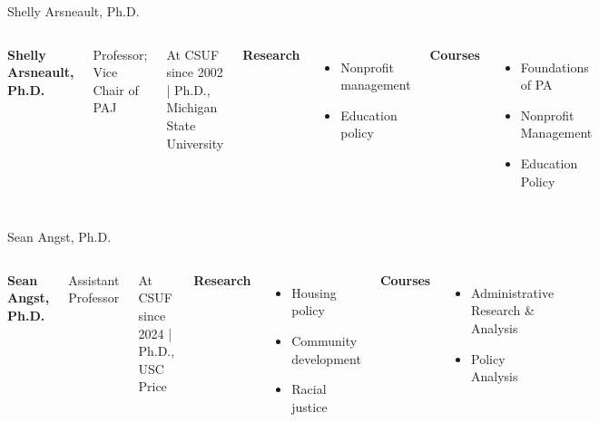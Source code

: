 \documentclass[10pt]{beamer}
\begin{document}
\begin{frame}{Shelly Arsneault, Ph.D.}
\begin{columns}[T,onlytextwidth]
    \raggedright
    {\large\bfseries Shelly Arsneault, Ph.D.}\par
    {Professor; Vice Chair of PAJ}\par
    {\footnotesize At CSUF since 2002 \quad | \quad Ph.D., Michigan State University}\par\vspace{0.4em}

    \textbf{Research}
    \begin{itemize}
      \item Nonprofit management
      \item Education policy
    \end{itemize}

    \textbf{Courses}
    \begin{itemize}
      \item Foundations of PA
      \item Nonprofit Management
      \item Education Policy
    \end{itemize}

    \vspace*{0.25cm}
\end{columns}
\end{frame}

\begin{frame}{Sean Angst, Ph.D.}
\begin{columns}[T,onlytextwidth]
    \raggedright
    {\large\bfseries Sean Angst, Ph.D.}\par
    {Assistant Professor}\par
    {\footnotesize At CSUF since 2024 \quad | \quad Ph.D., USC Price}\par\vspace{0.4em}

    \textbf{Research}
    \begin{itemize}
      \item Housing policy
      \item Community development
      \item Racial justice
    \end{itemize}

    \textbf{Courses}
    \begin{itemize}
      \item Administrative Research \& Analysis
      \item Policy Analysis
    \end{itemize}

    \vspace*{0.25cm}
\end{columns}
\end{frame}
\end{document}
